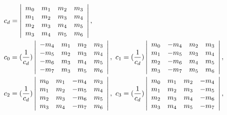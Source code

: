 \documentclass[journal,onecolumn,11pt]{IEEEtran}
\begin{document}
\begin{equation*}
\begin{aligned}
    \displaystyle&c_{d}=
    \left|
          \begin{array}{cccc}
            m_{0} & m_{1} & m_{2} & m_{3} \\
            m_{1} & m_{2} & m_{3} & m_{4}\\
            m_{2} & m_{3} & m_{4} & m_{5}\\
            m_{3} & m_{4} & m_{5} & m_{6}\\
          \end{array}
        \right|,\\
    \displaystyle&c_{0}= (\frac{1}{c_{d}})\left|
          \begin{array}{cccc}
            -m_{4} & m_{1} & m_{2} & m_{3}\\
            -m_{5} & m_{2} & m_{3} & m_{4}\\
            -m_{6} & m_{3} & m_{4} & m_{5}\\
            -m_{7} & m_{3} & m_{5} & m_{6}\\
          \end{array}
        \right|,\
    c_{1}= (\frac{1}{c_{d}})\left|
          \begin{array}{cccc}
            m_{0} & -m_{4} & m_{2} & m_{3}\\
            m_{1} & -m_{5} & m_{3} & m_{4}\\
            m_{2} & -m_{6} & m_{4} & m_{5}\\
            m_{3} & -m_{7} & m_{5} & m_{6}\\
          \end{array}
    \right|,\\
    \displaystyle&c_{2}= (\frac{1}{c_{d}})\left|
          \begin{array}{cccc}
            m_{0} & m_{1} & -m_{4} & m_{3} \\
            m_{1} & m_{2} & -m_{5} & m_{4}\\
            m_{2} & m_{3} & -m_{6} & m_{5}\\
            m_{3} & m_{4} & -m_{7} & m_{6}\\
          \end{array}
    \right|,\
       c_{3}= (\frac{1}{c_{d}})\left|
          \begin{array}{cccc}
            m_{0} & m_{1} & m_{2} & -m_{4} \\
            m_{1} & m_{2} & m_{3} & -m_{5}\\
            m_{2} & m_{3} & m_{4} & -m_{6}\\
            m_{3} & m_{4} & m_{5} & -m_{7}\\
          \end{array}
    \right|,
\end{aligned}
\end{equation*}
\end{document}
